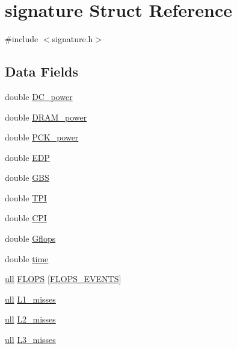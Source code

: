 \hypertarget{structsignature}{}\section{signature Struct Reference}
\label{structsignature}


{\ttfamily \#include $<$signature.\+h$>$}

\subsection*{Data Fields}
\begin{DoxyCompactItemize}
\item 
double \hyperlink{structsignature_a090373c629c5a94542b7e275a50afb3b}{D\+C\+\_\+power}
\item 
double \hyperlink{structsignature_a43a8aae472bd571fb68778a2a0445f79}{D\+R\+A\+M\+\_\+power}
\item 
double \hyperlink{structsignature_a64959c9028a6777f27869c5f8c57e8d0}{P\+C\+K\+\_\+power}
\item 
double \hyperlink{structsignature_af4a54bab38503d87f9ecdcaeae7dc9d5}{E\+DP}
\item 
double \hyperlink{structsignature_a6a6d7bfe0415926c5337b67fd30901d9}{G\+BS}
\item 
double \hyperlink{structsignature_a6ac9b090ff02df18291fe2c753ad0a9b}{T\+PI}
\item 
double \hyperlink{structsignature_a54efbc0ca632cc001a455b9871d37a0d}{C\+PI}
\item 
double \hyperlink{structsignature_a724ca9e31b09960e29067825cfef1af9}{Gflops}
\item 
double \hyperlink{structsignature_a2416e49937e7ca368c9a4bc353dede86}{time}
\item 
\hyperlink{generic_8h_aa5114a4fed348a29fb92123470476b1b}{ull} \hyperlink{structsignature_af1683c527a4767018d0d946f0c9f4a79}{F\+L\+O\+PS} \mbox{[}\hyperlink{signature_8h_a22fee790bdb92e1796e5302bf6c166a3}{F\+L\+O\+P\+S\+\_\+\+E\+V\+E\+N\+TS}\mbox{]}
\item 
\hyperlink{generic_8h_aa5114a4fed348a29fb92123470476b1b}{ull} \hyperlink{structsignature_ad7f8ec1d2e818b96abdc8791562e27e4}{L1\+\_\+misses}
\item 
\hyperlink{generic_8h_aa5114a4fed348a29fb92123470476b1b}{ull} \hyperlink{structsignature_a6a4e84da6393af7156e6f4dc8b172522}{L2\+\_\+misses}
\item 
\hyperlink{generic_8h_aa5114a4fed348a29fb92123470476b1b}{ull} \hyperlink{structsignature_a2f53eb030809b1ee5cc6c3c189a48268}{L3\+\_\+misses}

\end{DoxyCompactItemize}
